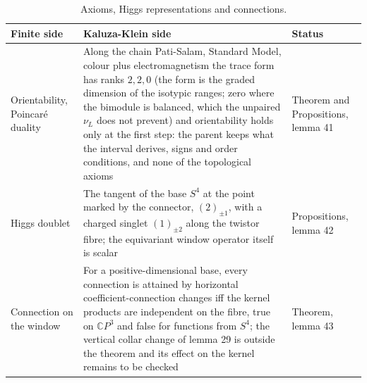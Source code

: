\documentclass[aps,prd,reprint,onecolumn,nofootinbib,amsmath,amssymb,floatfix]{revtex4-2}
\theoremstyle{plain}
\newcommand{\C}{\mathbb C}
\begin{document}
\begin{table}
\caption{\label{tab:axioms}Axioms, Higgs representations and connections.}
\setlength{\tabcolsep}{0.01\textwidth}
\begin{ruledtabular}
\begin{tabular}{p{}p{}p{}}
Finite side&Kaluza-Klein side&Status\\
\hline
Orientability, Poincar\'e duality&Along the chain Pati-Salam, Standard Model, colour plus electromagnetism the trace form has ranks $2,2,0$ (the form is the graded dimension of the isotypic ranges; zero where the bimodule is balanced, which the unpaired $\nu_L$ does not prevent) and orientability holds only at the first step: the parent keeps what the interval derives, signs and order conditions, and none of the topological axioms&Theorem and Propositions, lemma 41\\
Higgs doublet&The tangent of the base $S^4$ at the point marked by the connector, $(2)_{\pm1}$, with a charged singlet $(1)_{\pm2}$ along the twistor fibre; the equivariant window operator itself is scalar&Propositions, lemma 42\\
Connection on the window&For a positive-dimensional base, every connection is attained by horizontal coefficient-connection changes iff the kernel products are independent on the fibre, true on $\C P^3$ and false for functions from $S^4$; the vertical collar change of lemma 29 is outside the theorem and its effect on the kernel remains to be checked&Theorem, lemma 43\\
\end{tabular}
\end{ruledtabular}
\end{table}
\end{document}
